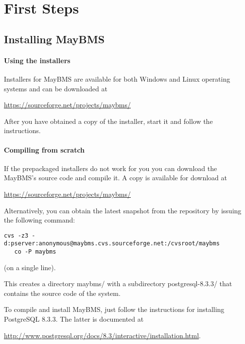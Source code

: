 





\chapter{First Steps}


\section{Installing MayBMS}


\subsubsection{Using the installers}

Installers for MayBMS are available for both Windows and Linux operating systems and can be downloaded at

\url{https://sourceforge.net/projects/maybms/}

After you have obtained a copy of the installer, start it and follow the instructions.

\subsubsection{Compiling from scratch}

If the prepackaged installers do not work for you you can download the MayBMS's source code and compile it.
A copy is available for download at

\url{https://sourceforge.net/projects/maybms/}

Alternatively, you can obtain the latest snapshot from the repository by issuing the following command:
\begin{verbatim}
cvs -z3 -d:pserver:anonymous@maybms.cvs.sourceforge.net:/cvsroot/maybms
   co -P maybms 
\end{verbatim}
(on a single line).

This creates a directory maybms/ with a subdirectory postgresql-8.3.3/
that contains the source code of the system.

To compile and install MayBMS, just follow the instructions for installing
PostgreSQL 8.3.3. The latter is documented at

\medskip

\url{http://www.postgresql.org/docs/8.3/interactive/installation.html}.

%
%
%
%
%

